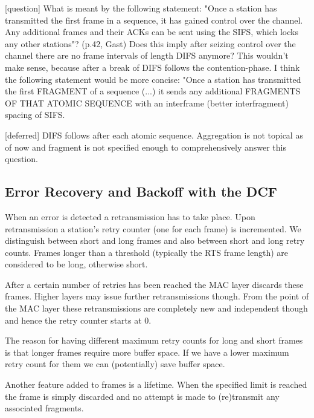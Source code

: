 \documentclass{article}
\begin{document}
	\bigskip
	
	\color{blue}
	[question] What is meant by the following statement: "Once a station has transmitted the first frame in a sequence, it has gained control over the channel. Any additional frames and their ACKs can be sent using the SIFS, which locks any other stations"? (p.42, Gast) Does this imply after seizing control over the channel there are no frame intervals of length DIFS anymore? This wouldn't make sense, because after a break of DIFS follows the contention-phase. I think the following statement would be more concise: "Once a station has transmitted the first FRAGMENT of a sequence (...) it sends any additional FRAGMENTS OF THAT ATOMIC SEQUENCE with an interframe (better interfragment) spacing of SIFS.
	\color{black}
	 
	\bigskip
	
	\color{red}
	[deferred] DIFS follows after each atomic sequence. Aggregation is not topical as of now and fragment is not specified enough to comprehensively answer this question.
	\color{black}
	 
	\subsection{Error Recovery and Backoff with the DCF}
	
	When an error is detected a retransmission has to take place. Upon retransmission a station's retry counter (one for each frame) is incremented. We distinguish between short and long frames and also between short and long retry counts. Frames longer than a threshold (typically the RTS frame length) are considered to be long, otherwise short.
	
	\bigskip
	
	After a certain number of retries has been reached the MAC layer discards these frames. Higher layers may issue further retransmissions though. From the point of the MAC layer these retransmissions are completely new and independent though and hence the retry counter starts at 0.
	
	\bigskip
	
	The reason for having different maximum retry counts for long and short frames is that longer frames require more buffer space. If we have a lower maximum retry count for them we can (potentially) save buffer space.
	
	\bigskip
	
	Another feature added to frames is a lifetime. When the specified limit is reached the frame is simply discarded and no attempt is made to (re)transmit any associated fragments.   
	
\end{document}
